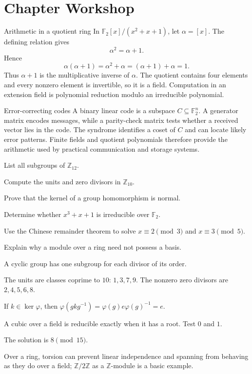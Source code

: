 \section{Chapter Workshop}

\begin{workedexample}{Arithmetic in a quotient ring}
In $\mathbb{F}_2[x]/(x^2+x+1)$, let $\alpha=[x]$. The defining relation gives
\[
    \alpha^2=\alpha+1.
\]
Hence
\[
    \alpha(\alpha+1)=\alpha^2+\alpha=(\alpha+1)+\alpha=1.
\]
Thus $\alpha+1$ is the multiplicative inverse of $\alpha$. The quotient contains four elements and every nonzero element is invertible, so it is a field. Computation in an extension field is polynomial reduction modulo an irreducible polynomial.
\end{workedexample}

\begin{applicationbox}{Error-correcting codes}
A binary linear code is a subspace $C\subseteq\mathbb{F}_2^n$. A generator matrix encodes messages, while a parity-check matrix tests whether a received vector lies in the code. The syndrome identifies a coset of $C$ and can locate likely error patterns. Finite fields and quotient polynomials therefore provide the arithmetic used by practical communication and storage systems.
\end{applicationbox}

\begin{chapterexercises}
    \item List all subgroups of $\mathbb{Z}_{12}$.
    \item Compute the units and zero divisors in $\mathbb{Z}_{10}$.
    \item Prove that the kernel of a group homomorphism is normal.
    \item Determine whether $x^3+x+1$ is irreducible over $\mathbb{F}_2$.
    \item Use the Chinese remainder theorem to solve $x\equiv2\pmod3$ and $x\equiv3\pmod5$.
    \item Explain why a module over a ring need not possess a basis.
\end{chapterexercises}

\begin{selectedhints}
    \item A cyclic group has one subgroup for each divisor of its order.
    \item The units are classes coprime to $10$: $1,3,7,9$. The nonzero zero divisors are $2,4,5,6,8$.
    \item If $k\in\ker\varphi$, then $\varphi(gkg^{-1})=\varphi(g)e\varphi(g)^{-1}=e$.
    \item A cubic over a field is reducible exactly when it has a root. Test $0$ and $1$.
    \item The solution is $8\pmod{15}$.
    \item Over a ring, torsion can prevent linear independence and spanning from behaving as they do over a field; $\mathbb{Z}/2\mathbb{Z}$ as a $\mathbb{Z}$-module is a basic example.
\end{selectedhints}
